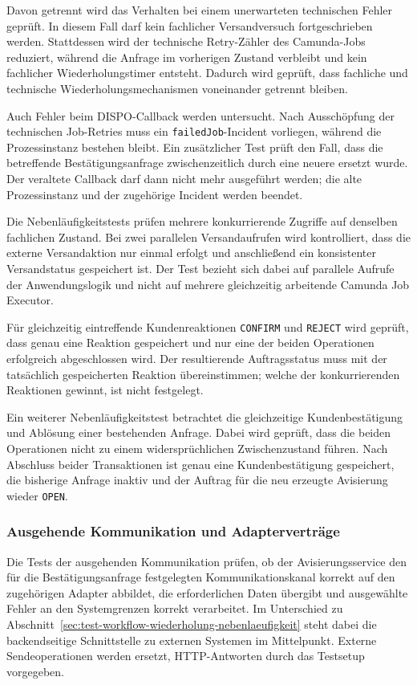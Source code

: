 Davon getrennt wird das Verhalten bei einem unerwarteten technischen Fehler
geprüft. In diesem Fall darf kein fachlicher Versandversuch fortgeschrieben
werden. Stattdessen wird der technische Retry-Zähler des Camunda-Jobs reduziert,
während die Anfrage im vorherigen Zustand verbleibt und kein fachlicher
Wiederholungstimer entsteht. Dadurch wird geprüft, dass fachliche und technische
Wiederholungsmechanismen voneinander getrennt bleiben.

Auch Fehler beim DISPO-Callback werden untersucht. Nach Ausschöpfung der
technischen Job-Retries muss ein \texttt{failedJob}-Incident vorliegen, während
die Prozessinstanz bestehen bleibt. Ein zusätzlicher Test prüft den Fall, dass
die betreffende Bestätigungsanfrage zwischenzeitlich durch eine neuere
ersetzt wurde. Der veraltete Callback darf dann nicht mehr ausgeführt werden;
die alte Prozessinstanz und der zugehörige Incident werden beendet.

Die Nebenläufigkeitstests prüfen mehrere konkurrierende Zugriffe auf denselben
fachlichen Zustand. Bei zwei parallelen Versandaufrufen wird kontrolliert, dass
die externe Versandaktion nur einmal erfolgt und anschließend ein konsistenter
Versandstatus gespeichert ist. Der Test bezieht sich dabei auf parallele
Aufrufe der Anwendungslogik und nicht auf mehrere gleichzeitig arbeitende
Camunda Job Executor.

Für gleichzeitig eintreffende Kundenreaktionen \texttt{CONFIRM} und
\texttt{REJECT} wird geprüft, dass genau eine Reaktion gespeichert und nur eine
der beiden Operationen erfolgreich abgeschlossen wird. Der resultierende
Auftragsstatus muss mit der tatsächlich gespeicherten Reaktion übereinstimmen;
welche der konkurrierenden Reaktionen gewinnt, ist nicht festgelegt.

Ein weiterer Nebenläufigkeitstest betrachtet die gleichzeitige
Kundenbestätigung und Ablösung einer bestehenden Anfrage. Dabei wird geprüft,
dass die beiden Operationen nicht zu einem widersprüchlichen Zwischenzustand
führen. Nach Abschluss beider Transaktionen ist genau eine Kundenbestätigung
gespeichert, die bisherige Anfrage inaktiv und der Auftrag für die neu erzeugte
Avisierung wieder \texttt{OPEN}.

\subsubsection{Ausgehende Kommunikation und Adapterverträge}
\label{sec:test-kommunikation-adaptervertraege}

Die Tests der ausgehenden Kommunikation prüfen, ob der Avisierungsservice den
für die Bestätigungsanfrage festgelegten Kommunikationskanal korrekt auf den
zugehörigen Adapter abbildet, die erforderlichen Daten übergibt und ausgewählte
Fehler an den Systemgrenzen korrekt verarbeitet. Im Unterschied zu
Abschnitt~\ref{sec:test-workflow-wiederholung-nebenlaeufigkeit} steht dabei die
backendseitige Schnittstelle zu externen Systemen im Mittelpunkt. Externe
Sendeoperationen werden ersetzt, HTTP-Antworten durch das Testsetup vorgegeben.

